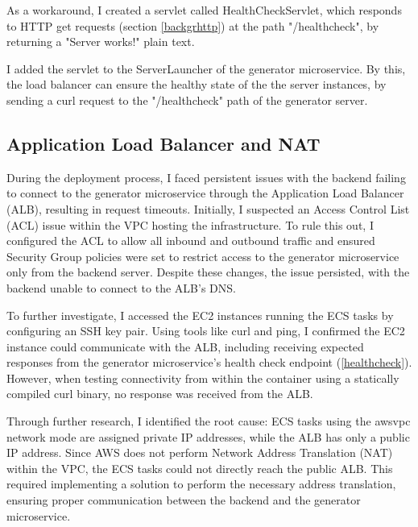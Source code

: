 		As a workaround, I created a servlet called HealthCheckServlet, which responds to HTTP get requests (section \ref{backgrhttp}) at the path "/healthcheck",
		by returning a "Server works!" plain text.

		I added the servlet to the ServerLauncher of the generator microservice. By this, the load balancer can ensure the healthy state of the 
		the server instances, by sending a curl request to the "/healthcheck" path of the generator server.

	\subsection{Application Load Balancer and NAT} \label{ALB NAT}
		During the deployment process, I faced persistent issues with the backend failing to connect to the generator microservice 
		through the Application Load Balancer (ALB), resulting in request timeouts. Initially, I suspected an Access Control List (ACL) 
		issue within the VPC hosting the infrastructure. To rule this out, I configured the ACL to allow all inbound and outbound traffic 
		and ensured Security Group policies were set to restrict access to the generator microservice only from the backend server. 
		Despite these changes, the issue persisted, with the backend unable to connect to the ALB's DNS.

		To further investigate, I accessed the EC2 instances running the ECS tasks by configuring an SSH key pair. 
		Using tools like curl and ping, I confirmed the EC2 instance could communicate with the ALB, including receiving expected responses 
		from the generator microservice's health check endpoint (\ref{healthcheck}). However, when testing connectivity from within the container 
		using a statically compiled curl binary, no response was received from the ALB.

		Through further research, I identified the root cause: ECS tasks using the awsvpc network mode are assigned private IP addresses, 
		while the ALB has only a public IP address. Since AWS does not perform Network Address Translation (NAT) within the VPC, 
		the ECS tasks could not directly reach the public ALB. This required implementing a solution to perform the necessary address translation, 
		ensuring proper communication between the backend and the generator microservice.


